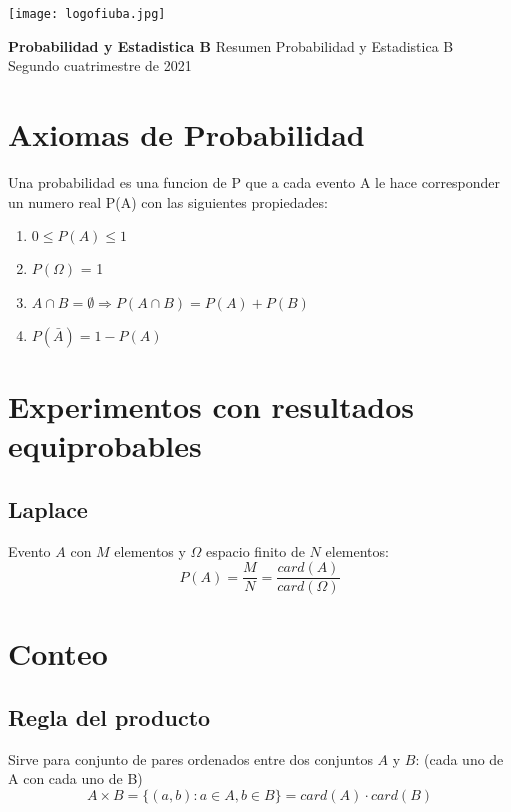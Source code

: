 \documentclass[titlepage,a4paper]{article}
\begin{document}
\begin{titlepage} %
	\hfill\texttt{[image: logofiuba.jpg]}
    \centering
    \vspace{20px}
    \newline
    
    \Huge \textbf{Probabilidad y Estadistica B}
    \vskip2cm
    \Large Resumen Probabilidad y Estadistica B\\
    Segundo cuatrimestre de 2021 
    
\end{titlepage}

\tableofcontents %
\newpage

\section{Axiomas de Probabilidad}

Una probabilidad es una funcion de P que a cada evento A le hace corresponder un numero real P(A) con las siguientes propiedades:
\begin{enumerate}
    \item $0 \leq P(A) \leq 1$ 
    \item $P(\Omega)$ = 1 
    \item $ A \cap B = \emptyset \Longrightarrow P(A \cap B) = P(A) + P(B)  $
    \item $P(\bar{A}) = 1  - P(A)$
\end{enumerate}

\section{Experimentos con resultados equiprobables}
\subsection{Laplace}
Evento $A$ con $M$ elementos y $\Omega$ espacio finito de $N$ elementos:
\begin{equation*}
    P(A) = \frac{M}{N} = \frac{card(A)}{card(\Omega)}
\end{equation*}

\section{Conteo}
\subsection{Regla del producto}
Sirve para conjunto de pares ordenados entre dos conjuntos $A$ y $B$: (cada uno de A con cada uno de B)
\begin{equation*}
    A \times  B = \{(a,b) : a \in A, b \in B \} = card(A) \cdot card(B)
\end{equation*}
\end{document}
